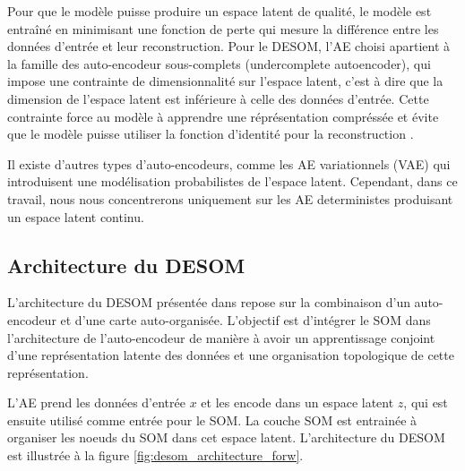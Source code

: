 \documentclass[12pt,a4paper]{report}
\begin{document}
Pour que le modèle puisse produire un espace latent de qualité, le modèle est entraîné en minimisant une fonction de perte qui mesure la différence entre les données 
d'entrée et leur reconstruction. Pour le DESOM, l'AE choisi apartient à la famille des auto-encodeur sous-complets (undercomplete autoencoder), 
qui impose une contrainte de dimensionnalité sur l'espace latent, c'est à dire que la dimension de l'espace latent est inférieure à celle des données d'entrée.
Cette contrainte force au modèle à apprendre une réprésentation compréssée et évite que le modèle puisse utiliser la fonction d'identité pour la reconstruction \cite{DESOM}.

Il existe d'autres types d'auto-encodeurs, comme les AE variationnels (VAE) qui introduisent une modélisation probabilistes de l'espace latent. 
Cependant, dans ce travail, nous nous concentrerons uniquement sur les AE deterministes produisant un espace latent continu.


\subsection{Architecture du DESOM}

L'architecture du DESOM présentée dans \cite{DESOM} repose sur la combinaison d'un auto-encodeur et d'une carte auto-organisée.
L'objectif est d'intégrer le SOM dans l'architecture de l'auto-encodeur de manière à avoir un apprentissage conjoint d'une représentation latente des données et 
une organisation topologique de cette représentation.

L'AE prend les données d'entrée $x$ et les encode dans un espace latent $z$, qui est ensuite utilisé comme entrée pour le SOM.
La couche SOM est entrainée à organiser les noeuds du SOM dans cet espace latent.
L'architecture du DESOM est illustrée à la figure \ref{fig:desom_architecture_forw}.
\end{document}
